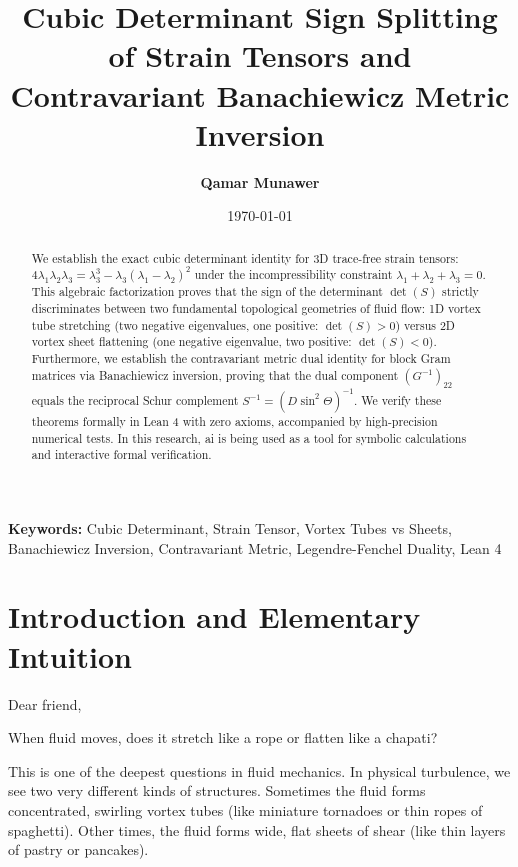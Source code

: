\documentclass[11pt,a4paper]{article}
\title{\textbf{Cubic Determinant Sign Splitting of Strain Tensors and Contravariant Banachiewicz Metric Inversion}}
\author{\textbf{Qamar Munawer}}
\date{\today}
\theoremstyle{definition}
\begin{document}
\maketitle

\begin{abstract}
We establish the exact cubic determinant identity for 3D trace-free strain tensors: $4 \lambda_1 \lambda_2 \lambda_3 = \lambda_3^3 - \lambda_3 (\lambda_1 - \lambda_2)^2$ under the incompressibility constraint $\lambda_1 + \lambda_2 + \lambda_3 = 0$. This algebraic factorization proves that the sign of the determinant $\det(S)$ strictly discriminates between two fundamental topological geometries of fluid flow: 1D vortex tube stretching (two negative eigenvalues, one positive: $\det(S) > 0$) versus 2D vortex sheet flattening (one negative eigenvalue, two positive: $\det(S) < 0$). Furthermore, we establish the contravariant metric dual identity for block Gram matrices via Banachiewicz inversion, proving that the dual component $(G^{-1})_{22}$ equals the reciprocal Schur complement $S^{-1} = (D \sin^2 \Theta)^{-1}$. We verify these theorems formally in Lean 4 with zero axioms, accompanied by high-precision numerical tests. In this research, ai is being used as a tool for symbolic calculations and interactive formal verification.
\end{abstract}

\vspace{1em}
\noindent\textbf{Keywords:} Cubic Determinant, Strain Tensor, Vortex Tubes vs Sheets, Banachiewicz Inversion, Contravariant Metric, Legendre-Fenchel Duality, Lean 4

\section{Introduction and Elementary Intuition}

Dear friend,

When fluid moves, does it stretch like a rope or flatten like a chapati?

This is one of the deepest questions in fluid mechanics. In physical turbulence, we see two very different kinds of structures. Sometimes the fluid forms concentrated, swirling vortex tubes (like miniature tornadoes or thin ropes of spaghetti). Other times, the fluid forms wide, flat sheets of shear (like thin layers of pastry or pancakes).
\end{document}
